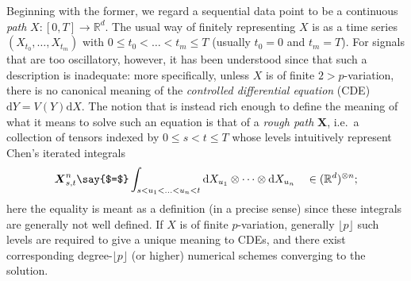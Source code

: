 \documentclass{article}
\def\d{\mathrm{d}}
\newcommand{\bX}{\boldsymbol{X}}
\def\p{{\lfloor p \rfloor}}
\numberwithin{equation}{section}
\theoremstyle{definition}
\theoremstyle{remark}
\begin{document}
Beginning with the former, we regard a sequential data point to be a continuous \emph{path} $X \colon [0,T] \to \mathbb R^d$. The usual way of finitely representing $X$ is as a time series $(X_{t_0}, \ldots, X_{t_m})$ with $0 \leq t_0 < \ldots < t_m \leq T$ (usually $t_0 = 0$ and $t_m = T$). For signals that are too oscillatory, however, it has been understood since \cite{Lyo98} that such a description is inadequate: more specifically, unless $X$ is of finite $2 > p$-variation, there is no canonical meaning of the \emph{controlled differential equation} (CDE) $\d Y = V(Y)\d X$. The notion that is instead rich enough to define the meaning of what it means to solve such an equation is that of a \emph{rough path} $\bX$, i.e.\ a collection of tensors indexed by $0 \leq s < t \leq T$ whose levels intuitively represent Chen's \cite{Chen54} iterated integrals
\begin{equation}\label{eq:rp}
\bX_{s,t}^n  \text{\say{$=$}} \int_{s < u_1 < \ldots < u_n < t} \d X_{u_1} \otimes \cdots \otimes \d X_{u_n} \quad\in (\mathbb R^d)^{\otimes n};
\end{equation}
here the equality is meant as a definition (in a precise sense) since these integrals are generally not well defined. If $X$ is of finite $p$-variation, generally $\p$ such levels are required to give a unique meaning to CDEs, and there exist corresponding degree-$\p$ (or higher) numerical schemes converging to the solution.
\end{document}

